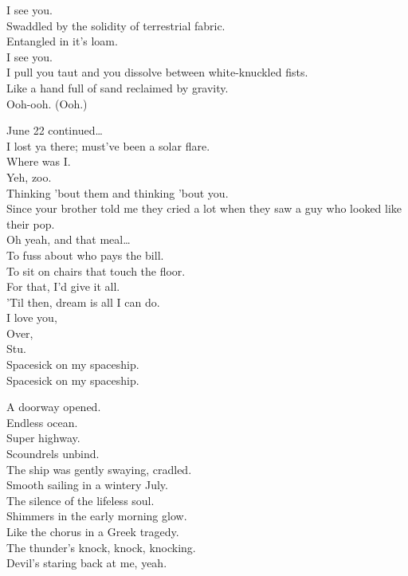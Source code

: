 
I see you. \\
Swaddled by the solidity of terrestrial fabric. \\
Entangled in it's loam. \\
I see you. \\
I pull you taut and you dissolve between white-knuckled fists. \\
Like a hand full of sand reclaimed by gravity. \\
Ooh-ooh. (Ooh.) \\


June 22 continued… \\
I lost ya there; must've been a solar flare. \\
Where was I. \\
Yeh, zoo. \\
Thinking 'bout them and thinking 'bout you. \\
Since your brother told me they cried a lot when they saw a guy who looked like their pop. \\
Oh yeah, and that meal… \\
To fuss about who pays the bill. \\
To sit on chairs that touch the floor. \\
For that, I'd give it all. \\
'Til then, dream is all I can do. \\
I love you, \\
Over, \\
Stu. \\

Spacesick on my spaceship. \\
Spacesick on my spaceship. \\





A doorway opened. \\
Endless ocean. \\
Super highway. \\
Scoundrels unbind. \\
The ship was gently swaying, cradled. \\
Smooth sailing in a wintery July. \\
The silence of the lifeless soul. \\
Shimmers in the early morning glow. \\
Like the chorus in a Greek tragedy. \\
The thunder's knock, knock, knocking. \\
Devil's staring back at me, yeah. \\

